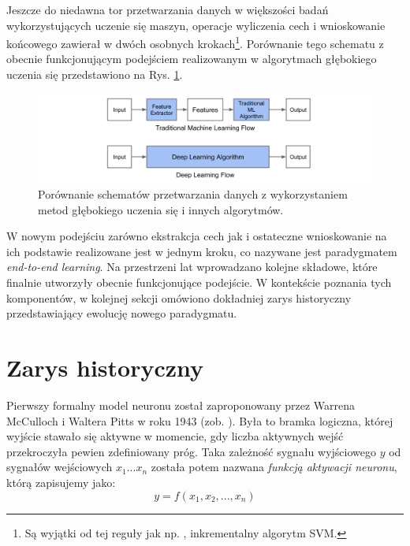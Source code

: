 Jeszcze do niedawna tor przetwarzania danych w większości badań wykorzystujących uczenie się maszyn, operacje wyliczenia cech i wnioskowanie końcowego zawierał w dwóch osobnych krokach\footnote{Są wyjątki od tej reguły jak np. \cite{10.1007/978-3-319-58667-0_7}, inkrementalny algorytm SVM.}. Porównanie tego schematu z obecnie funkcjonującym podejściem realizowanym w algorytmach głębokiego uczenia się przedstawiono na Rys. \ref{DLworkflow}.
\begin{figure}[h!]
	\centering
	\includegraphics[width=1\textwidth]{figures/DLworkflow.png}
	\caption{Porównanie schematów przetwarzania danych z wykorzystaniem metod głębokiego uczenia się i innych algorytmów.}
	\label{DLworkflow}
\end{figure}
W nowym podejściu zarówno ekstrakcja cech jak i ostateczne wnioskowanie na ich podstawie realizowane jest w jednym kroku, co nazywane jest paradygmatem \textit{end-to-end learning}. Na przestrzeni lat wprowadzano kolejne składowe, które finalnie utworzyły obecnie funkcjonujące podejście. W kontekście poznania tych komponentów, w kolejnej sekcji omówiono dokładniej zarys historyczny przedstawiający ewolucję nowego paradygmatu. 

\section{Zarys historyczny}

Pierwszy formalny model neuronu został zaproponowany przez Warrena McCulloch i Waltera Pitts w roku 1943 (zob. \cite{McCulloch1943}). Była to bramka logiczna, której wyjście stawało się aktywne w momencie, gdy liczba aktywnych wejść przekroczyła pewien zdefiniowany próg. Taka zależność sygnału wyjściowego $y$ od sygnałów wejściowych $x_1$...$x_n$ została potem nazwana \textit{funkcją aktywacji neuronu}, którą zapisujemy jako:
\begin{equation}
\label{eqActFunc}
y=f\left(x_1, x_2,..., x_n\right)
\end{equation}

